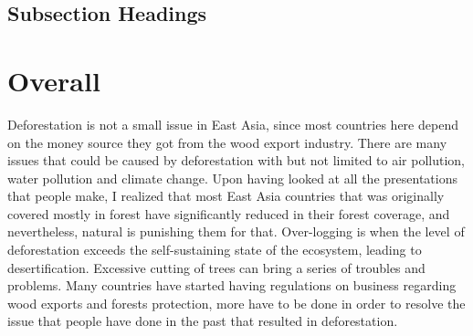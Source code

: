 \documentclass{book}\usepackage{knitr}
\begin{document}
{\subsection{Subsection Headings} %





\section{Overall}
Deforestation is not a small issue in East Asia, since most countries here depend on the money source they got from the wood export industry. There are many issues that could be caused by deforestation with but not limited to air pollution, water pollution and climate change. Upon having looked at all the presentations that people make, I realized that most East Asia countries that was originally covered mostly in forest have significantly reduced in their forest coverage, and nevertheless, natural is punishing them for that. Over-logging is when the level of deforestation exceeds the self-sustaining state of the ecosystem, leading to desertification. Excessive cutting of trees can bring a series of troubles and problems. Many countries have started having regulations on business regarding wood exports and forests protection, more have to be done in order to resolve the issue that people have done in the past that resulted in deforestation. 

}
\end{document}
